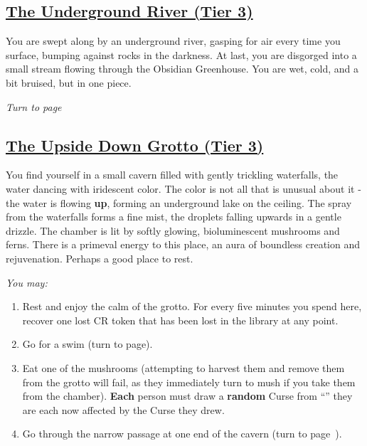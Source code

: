 \documentclass[sheet]{GL2020}
\begin{document}
\clearpage

\begin{center}\section*{\underline{The Underground River (Tier 3)}}\end{center}
\label{UndergroundRiver}

You are swept along by an underground river, gasping for air every time you surface, bumping against rocks in the darkness. At last, you are disgorged into a small stream flowing through the Obsidian Greenhouse. You are wet, cold, and a bit bruised, but in one piece.

\emph{Turn to page ~\pageref{ObsidianGreenhouse}}

\clearpage

\begin{center}\section*{\underline{The Upside Down Grotto (Tier 3)}}\end{center}
\label{UpsideDownGrotto}

You find yourself in a small cavern filled with gently trickling waterfalls, the water dancing with iridescent color. The color is not all that is unusual about it - the water is flowing \textbf{up}, forming an underground lake on the ceiling. The spray from the waterfalls forms a fine mist, the droplets falling upwards in a gentle drizzle. The chamber is lit by softly glowing, bioluminescent mushrooms and ferns. There is a primeval energy to this place, an aura of boundless creation and rejuvenation. Perhaps a good place to rest. 


\vspace{0.5cm}

\begingroup
\itshape
You may:
\begin{enumerate}[A]
  \item Rest and enjoy the calm of the grotto. For every five minutes you spend here, recover one lost CR token that has been lost in the library at any point.
	\item Go for a swim (turn to page\pageref{SwimminGrotto}).
	\item Eat one of the mushrooms (attempting to harvest them and remove them from the grotto will fail, as they immediately turn to mush if you take them from the chamber). \textbf{Each} person must draw a \textbf{random} Curse from ``\sCursedCodicesEnvelope{}'' they are each now affected by the Curse they drew. 
	\item Go through the narrow passage at one end of the cavern (turn to page~\pageref{TierThreeHub}).
\end{enumerate}
\endgroup
\end{document}
